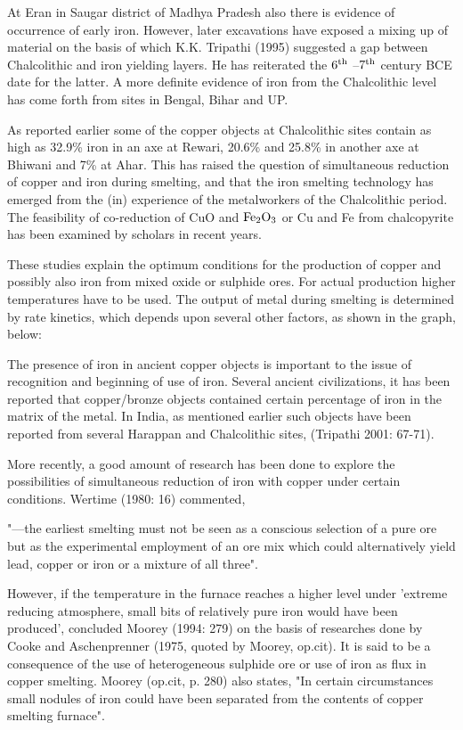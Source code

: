At Eran in Saugar district of Madhya Pradesh also there is evidence of occurrence of early iron. However, later excavations have exposed a mixing up of material on the basis of which K.K. Tripathi (1995) suggested a gap between Chalcolithic and iron yielding layers. He has reiterated the $6^{\rm th}$ –$7^{\rm th}$ century BCE date for the latter. A more definite evidence of iron from the Chalcolithic level has come forth from sites in Bengal, Bihar and UP.

As reported earlier some of the copper objects at Chalcolithic sites contain as high as 32.9\% iron in an axe at Rewari, 20.6\% and 25.8\% in another axe at Bhiwani and 7\% at Ahar. This has raised the question of simultaneous reduction of copper and iron during smelting, and that the iron smelting technology has emerged from the (in) experience of the metalworkers of the Chalcolithic period. The feasibility of co-reduction of CuO and ${\rm Fe}_{2}{\rm O}_{3}$ or Cu and Fe from chalcopyrite has been examined by scholars in recent years.

These studies explain the optimum conditions for the production of copper and possibly also iron from mixed oxide or sulphide ores. For actual production higher temperatures have to be used. The output of metal during smelting is determined by rate kinetics, which depends upon several other factors, as shown in the graph, below:

The presence of iron in ancient copper objects is important to the issue of recognition and beginning of use of iron. Several ancient civilizations, it has been reported that copper/bronze objects contained certain percentage of iron in the matrix of the metal. In India, as mentioned earlier such objects have been reported from several Harappan and Chalcolithic sites, (Tripathi 2001: 67-71).

More recently, a good amount of research has been done to explore the possibilities of simultaneous reduction of iron with copper under certain conditions. Wertime (1980: 16) commented,

{\footnotesize "---the earliest smelting must not be seen as a conscious selection of a pure ore but as the experimental employment of an ore mix which could alternatively yield lead, copper or iron or a mixture of all three".}

However, if the temperature in the furnace reaches a higher level under 'extreme reducing atmosphere, small bits of relatively pure iron would have been produced', concluded Moorey (1994: 279) on the basis of researches done by Cooke and Aschenprenner (1975, quoted by Moorey, op.cit). It is said to be a consequence of the use of heterogeneous sulphide ore or use of iron as flux in copper smelting. Moorey (op.cit, p. 280) also states, "In certain circumstances small nodules of iron could have been separated from the contents of copper smelting furnace".

